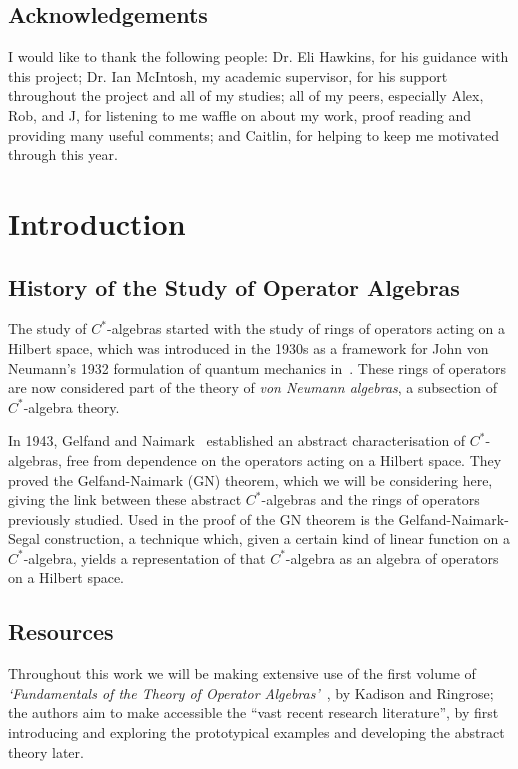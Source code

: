 \documentclass[11pt,a4paper]{report}
\theoremstyle{plain}
\theoremstyle{definition}
\newcommand{\1}{\mathbbm{1}}
\begin{document}
\iftrue \vfill
\section*{Acknowledgements}
I would like to thank the following people: Dr. Eli Hawkins, for his 
guidance with this project; Dr. Ian McIntosh, my academic supervisor, for his 
support throughout the project and all of my studies; all of my peers, 
especially Alex, Rob, and J, for listening to me waffle on about my work, proof reading and 
providing many useful comments; and Caitlin, for helping to keep me motivated 
through this year.
\fi


\chapter{Introduction}
\section{History of the Study of Operator Algebras}
The study of $C^\ast$-algebras started with the study of rings of operators 
acting on a Hilbert space, which was introduced in the 1930s as a framework for 
John von Neumann's 1932 formulation of quantum mechanics in~\cite{vonneumann32}. 
These rings of operators are now considered part of the theory of \emph{von 
Neumann algebras}, a subsection of $C^\ast$-algebra theory. 



{In 1943, Gelfand and Naimark~\cite{gelfand43} established an abstract 
characterisation of $C^\ast$-algebras, free from dependence on the operators 
acting on a Hilbert space. They proved the Gelfand-Naimark (GN) theorem, which 
we will be considering here, giving the link between these abstract 
$C^\ast$-algebras and the rings of operators previously studied. Used in the 
proof of the GN theorem is the Gelfand-Naimark-Segal construction, a technique 
which, given a certain kind of linear function on a $C^\ast$-algebra, yields a 
representation of that $C^\ast$-algebra as an algebra of operators on a Hilbert 
space.} 

\section{Resources}
Throughout this work we will be making extensive use of the first volume of 
\emph{`Fundamentals of the Theory of Operator Algebras'}~\cite{kadison83,kadison86}, 
by Kadison and Ringrose; the authors aim to make 
accessible the ``vast recent research literature'', by first introducing and 
exploring the prototypical examples and developing the abstract theory later. 
\end{document}
